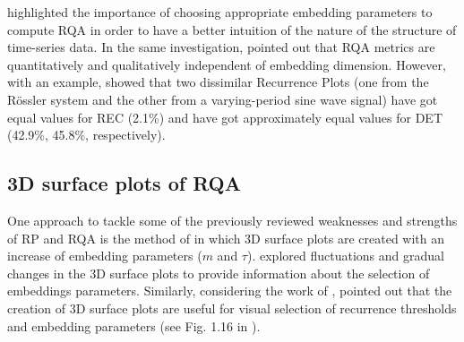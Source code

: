 \cite{iwanski1998} highlighted the importance of choosing 
appropriate embedding parameters to compute RQA 
in order to have a better intuition of the nature 
of the structure of time-series data.
In the same investigation, \cite{iwanski1998} pointed out 
that RQA metrics are quantitatively and qualitatively independent of 
embedding dimension. However, with an example, \cite{iwanski1998} 
showed that two dissimilar Recurrence Plots 
(one from the R\"{o}ssler system and 
the other from a varying-period sine wave signal) have got equal 
values for REC (2.1\%) and have got approximately equal values 
for DET (42.9\%, 45.8\%, respectively).

\subsection{3D surface plots of RQA} \label{sec:3d_rqa}
One approach to tackle some of the previously reviewed weaknesses and 
strengths of RP and RQA is the method of \cite{zbilut1992} 
in which 3D surface plots are created with an increase of 
embedding parameters ($m$ and $\tau$). 
\cite{zbilut1992} explored fluctuations and gradual 
changes in the 3D surface plots to provide information 
about the selection of embeddings parameters. 
Similarly, considering the work of \cite{webber2018}, 
\cite{marwan2015} pointed out that the creation 
of 3D surface plots are useful for visual selection of 
recurrence thresholds and embedding parameters 
(see Fig. 1.16 in \cite{marwan2015}). 

